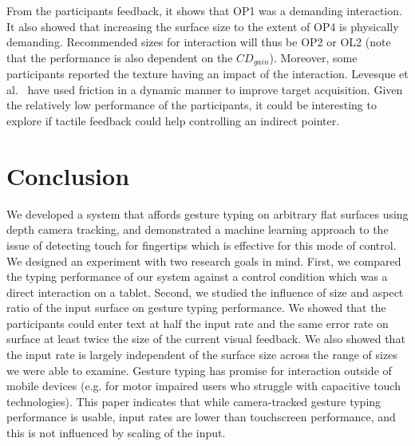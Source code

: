 \documentclass{chi-ext}
\newcommand{\cdt}[1]{{\small\uppercase{{#1}}}}
\begin{document}
From the participants feedback, it shows that \cdt{OP1} was a demanding interaction. It also showed that increasing the surface size to the extent of \cdt{OP4} is physically demanding. Recommended sizes for interaction will thus be \cdt{OP2} or \cdt{OL2} (note that the performance is also dependent on the $CD_{gain}$). Moreover, some participants reported the texture having an impact of the interaction. Levesque et al.~\cite{Levesque2011} have used friction in a dynamic manner to improve target acquisition. Given the relatively low performance of the participants, it could be interesting to explore if tactile feedback could help controlling an indirect pointer.

\section{Conclusion}
We developed a system that affords gesture typing on arbitrary flat surfaces using depth camera tracking, and demonstrated a machine learning approach to the issue of detecting touch for fingertips which is effective for this mode of control. We designed an experiment with two research goals in mind. First, we compared the typing performance of our system against a control condition which was a direct interaction on a tablet. Second, we studied the influence of size and aspect ratio of the input surface on gesture typing performance. We showed that the participants could enter text at half the input rate and the same error rate on surface at least twice the size of the current visual feedback. We also showed that the input rate is largely independent of the surface size across the range of sizes we were able to examine. Gesture typing has promise for interaction outside of mobile devices (e.g. for motor impaired users who struggle with capacitive touch technologies). This paper indicates that while camera-tracked gesture typing performance is usable, input rates are lower than touchscreen performance, and this is not influenced by scaling of the input.




\balance


\end{document}
